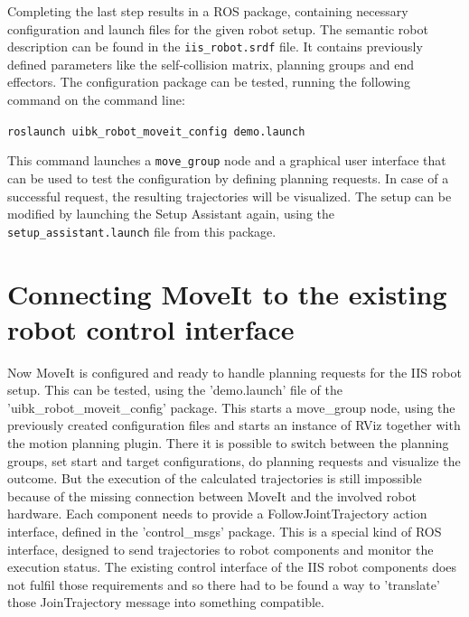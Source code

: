 Completing the last step results in a ROS package, containing necessary configuration and launch files for the given robot setup. The semantic robot description can be found in the \texttt{iis\_robot.srdf} file. It contains previously defined parameters like the self-collision matrix, planning groups and end effectors. The configuration package can be tested, running the following command on the command line:
\begin{center}
\texttt{roslaunch uibk\_robot\_moveit\_config demo.launch}
\end{center}
This command launches a \texttt{move\_group} node and a graphical user interface that can be used to test the configuration by defining planning requests. In case of a successful request, the resulting trajectories will be visualized. The setup can be modified by launching the Setup Assistant again, using the \texttt{setup\_assistant.launch} file from this package.

\section{Connecting MoveIt to the existing robot control interface}

Now MoveIt is configured and ready to handle planning requests for the IIS robot setup. This can be tested, using the 'demo.launch' file of the 'uibk\_robot\_moveit\_config' package. This starts a move\_group node, using the previously created configuration files and starts an instance of RViz together with the motion planning plugin. There it is possible to switch between the planning groups, set start and target configurations, do planning requests and visualize the outcome. But the execution of the calculated trajectories is still impossible because of the missing connection between MoveIt and the involved robot hardware. Each component needs to provide a FollowJointTrajectory action interface, defined in the 'control\_msgs' package. This is a special kind of ROS interface, designed to send trajectories to robot components and monitor the execution status. The existing control interface of the IIS robot components does not fulfil those requirements and so there had to be found a way to 'translate' those JoinTrajectory message into something compatible.

